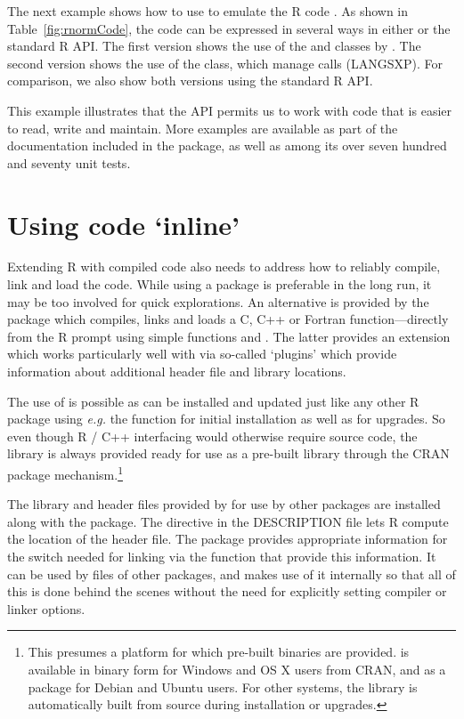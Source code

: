 The next example shows how to use  to emulate the R code
.
%
As shown in Table~\ref{fig:rnormCode}, the code can be expressed in several
ways in either  or the standard R API. The first version shows the
use of the  and  classes by
.
The second version shows the use of the  class, which 
manage calls (LANGSXP). 
For comparison, we also show both versions using the standard R API.

This example illustrates that the  API permits us to work with code
that is easier to read, write and maintain. More examples are available as
part of the documentation included in the  package, as well as
among its over seven hundred and seventy unit tests.

\section{Using code `inline'}
\label{sec:inline}

Extending R with compiled code also needs to address how to reliably compile,
link and load the code.  While using a package is preferable in the long run,
it may be too involved for quick explorations. An alternative is
provided by the  package \citep{cran:inline} which compiles,
links and loads a C, C++ or Fortran function---directly from the R prompt
using simple functions  and .  The latter provides an extension which
works particularly well with  via so-called `plugins' which provide
information about additional header file and
library locations. 

The use of  is possible as  can be installed and
updated just like any other R package using \textsl{e.g.} the
 function for initial installation as well as
 for upgrades.  So even though R / C++ interfacing
would otherwise require source code, the  library is always provided
ready for use as a pre-built library through the CRAN package
mechanism.\footnote{This presumes a platform for which pre-built binaries are
  provided.  is available in binary form for Windows and OS X users from
  CRAN, and as a  package for Debian and Ubuntu users. For other systems, the
   library is automatically built from source during installation
  or upgrades.}

The library and header files provided by  for use by other packages
are installed along with the  package. The 
directive in the DESCRIPTION file lets R compute the location of the header
file. The  package provides appropriate information for the 
switch needed for linking via the function  that
provide this information. It can be used by  files of other
packages, and  makes use of it internally so that all of this is
done behind the scenes without the need for explicitly setting compiler or
linker options.

